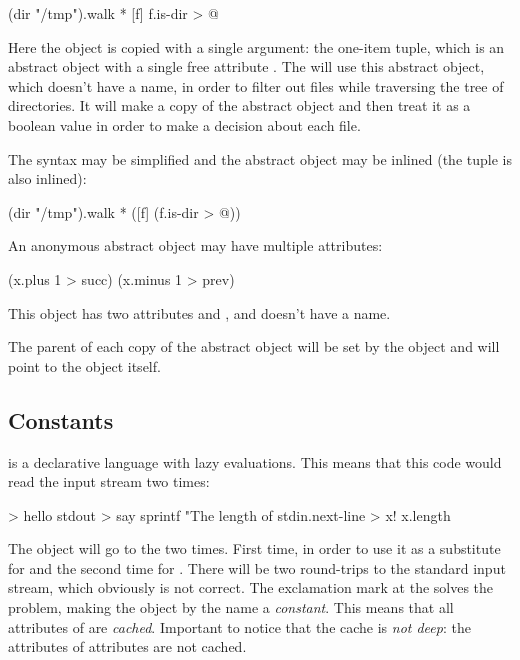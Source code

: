 \begin{ffcode}
(dir "/tmp").walk
  *
    [f]
      f.is-dir > @
\end{ffcode}

Here the object  is copied with a single argument:
the one-item tuple, which is an
abstract object with a single free attribute . The 
will use this abstract object, which doesn't have a name, in order
to filter out files while traversing the tree of directories. It will
make a copy of the abstract object and then treat it as a boolean
value in order to make a decision about each file.

The syntax may be simplified and the abstract object may be inlined
(the tuple is also inlined):

\begin{ffcode}
(dir "/tmp").walk
  * ([f] (f.is-dir > @))
\end{ffcode}

An anonymous abstract object may have multiple attributes:

\begin{ffcode}
[x] (x.plus 1 > succ) (x.minus 1 > prev)
\end{ffcode}

This object has two attributes  and , and doesn't
have a name.

The parent of each copy of the abstract object will be set by
the object  and will point to the  object itself.

\subsection{Constants}

\eo{} is a declarative language with lazy evaluations. This means
that this code would read the input stream two times:

\begin{ffcode}
[] > hello
  stdout > say
    sprintf
      "The length of %
      stdin.next-line > x!
      x.length
\end{ffcode}

The  object will go to the  two times. First time,
in order to use it as a substitute for  and the second time for
. There will be two round-trips to the standard input stream, which
obviously is not correct. The exclamation mark at the  solves the
problem, making the object by the name  a \emph{constant}. This means
that all attributes of  are \emph{cached}. Important to notice
that the cache is \emph{not deep}: the attributes of attributes are not cached.

